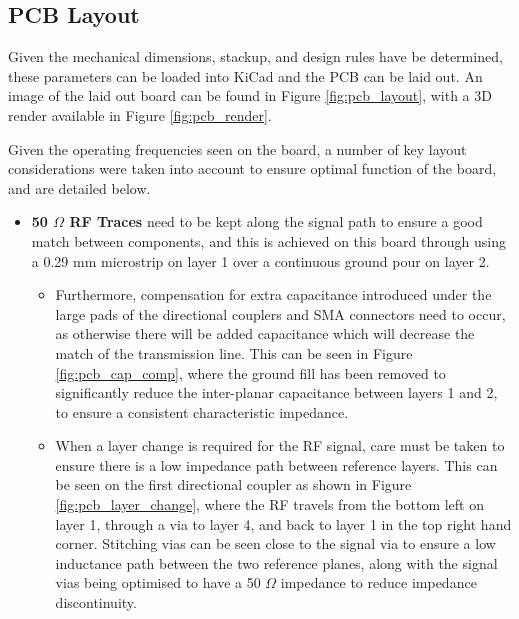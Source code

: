 \subsection{PCB Layout}
Given the mechanical dimensions, stackup, and design rules have be determined, these parameters can be loaded into KiCad and the PCB can be laid out. An image of the laid out board can be found in Figure \ref{fig:pcb_layout}, with a 3D render available in Figure \ref{fig:pcb_render}.

Given the operating frequencies seen on the board, a number of key layout considerations were taken into account to ensure optimal function of the board, and are detailed below.
\begin{itemize}
	\item \textbf{50 $\Omega$ RF Traces} need to be kept along the signal path to ensure a good match between components, and this is achieved on this board through using a 0.29 mm microstrip on layer 1 over a continuous ground pour on layer 2. 
	\begin{itemize}
		\item Furthermore, compensation for extra capacitance introduced under the large pads of the directional couplers and SMA connectors need to occur, as otherwise there will be added capacitance which will decrease the match of the transmission line. This can be seen in Figure \ref{fig:pcb_cap_comp}, where the ground fill has been removed to significantly reduce the inter-planar capacitance between layers 1 and 2, to ensure a consistent characteristic impedance. 
		\item When a layer change is required for the RF signal, care must be taken to ensure there is a low impedance path between reference layers. This can be seen on the first directional coupler as shown in Figure \ref{fig:pcb_layer_change}, where the RF travels from the bottom left on layer 1, through a via to layer 4, and back to layer 1 in the top right hand corner. Stitching vias can be seen close to the signal via to ensure a low inductance path between the two reference planes, along with the signal vias being optimised to have a 50 $\Omega$ impedance to reduce impedance discontinuity. 
		

\end{itemize}
\end{itemize}
